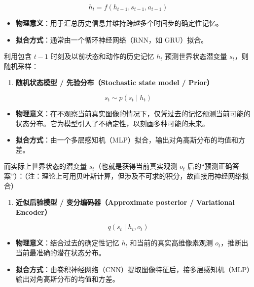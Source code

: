 \[
h_t = f(h_{t-1}, s_{t-1}, a_{t-1})
\]

\begin{itemize}
\tightlist
\item
  \textbf{物理意义}：用于汇总历史信息并维持跨越多个时间步的确定性记忆。
\item
  \textbf{拟合方式}：通常由一个循环神经网络（RNN，如 GRU）拟合。
\end{itemize}

利用包含 \(t-1\) 时刻及以前状态和动作的历史记忆 \(h_t\) 预测世界状态潜变量 \(s_t\)，则随机采样：

\begin{enumerate}
\def\labelenumi{\arabic{enumi}.}
\setcounter{enumi}{1}
\tightlist
\item
  \textbf{随机状态模型 / 先验分布（Stochastic state model / Prior）}
\end{enumerate}

\[
s_t \sim p(s_t \mid h_t)
\]

\begin{itemize}
\tightlist
\item
  \textbf{物理意义}：在不观察当前真实图像的情况下，仅凭过去的记忆预测当前可能的状态分布。它为模型引入了不确定性，以刻画多种可能的未来。
\item
  \textbf{拟合方式}：由一个多层感知机（MLP）拟合，输出对角高斯分布的均值和方差。
\end{itemize}

而实际上世界状态的潜变量 \(s_t\)（也就是获得当前真实观测 \(o_t\) 后的``预测正确答案''）：（注：理论上可用贝叶斯计算，但涉及不可求的积分，故直接用神经网络拟合）

\begin{enumerate}
\def\labelenumi{\arabic{enumi}.}
\setcounter{enumi}{2}
\tightlist
\item
  \textbf{近似后验模型 / 变分编码器（Approximate posterior / Variational Encoder）}
\end{enumerate}

\[
q(s_t \mid h_t, o_t)
\]

\begin{itemize}
\tightlist
\item
  \textbf{物理意义}：结合过去的确定性记忆 \(h_t\) 和当前的真实高维像素观测 \(o_t\)，推断出当前最准确的潜在状态分布。
\item
  \textbf{拟合方式}：由卷积神经网络（CNN）提取图像特征后，接多层感知机（MLP）输出对角高斯分布的均值和方差。
\end{itemize}

